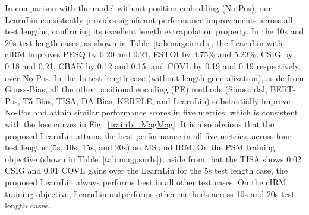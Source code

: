 \documentclass[journal]{IEEEtran}
\begin{document}

In comparison with the model without position embedding (No-Pos), our LearnLin consistently provides significant performance improvements across all test lengths, confirming its excellent length extrapolation property. In the 10s and 20s test length cases, as shown in Table~\ref{tab:magcirm1s}, the LearnLin with cIRM improves PESQ by 0.20 and 0.21, ESTOI by 4.75\% and 5.23\%, CSIG by 0.18 and 0.21, CBAK by 0.12 and 0.15, and COVL by 0.19 and 0.19 respectively, over No-Pos. In the 1s test length case (without length generalization), aside from Gauss-Bias, all the other positional encoding (PE) methods (Sinusoidal, BERT-Pos, T5-Bias, TISA, DA-Bias, KERPLE, and LearnLin) substantially improve No-Pos and attain similar performance scores in five metrics, which is consistent with the loss curves in Fig.~\ref{train1s_MagMag}. It is also obvious that the proposed LearnLin attains the best performance in all five metrics, across four test lengths (5s, 10s, 15s, and 20s) on MS and IRM. On the PSM training objective (shown in Table~\ref{tab:magpsm1s}), aside from that the TISA shows 0.02 CSIG and 0.01 COVL gains over the LearnLin for the 5s test length case, the proposed LearnLin always performs best in all other test cases. On the cIRM training objective, LearnLin outperforms other methods across 10s and 20s test length cases.
\end{document}

